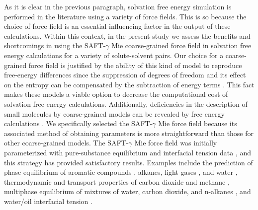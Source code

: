 \documentclass[final,12p,times,twocolumn]{elsarticle}
\begin{document}
	As it is clear in the previous paragraph, solvation free energy simulation is performed in the literature using a variety of force fields. This is so because the choice of force field is an essential influencing factor in the output of these calculations. Within this context, in the present study we assess the benefits and shortcomings in using the SAFT-$\gamma$ Mie coarse-grained force field \cite{avendano2011} in solvation free energy calculations for a variety of solute-solvent pairs. Our choice for a coarse-grained force field is justified by the ability of this kind of model to reproduce free-energy differences since the suppression of degrees of freedom and its effect on the entropy can be compensated by the subtraction of energy terms \cite{kmiecik2016}. This fact makes these models a viable option to decrease the computational cost of solvation-free energy calculations. Additionally, deficiencies in the description of small molecules by coarse-grained models can be revealed by free energy calculations \cite{mobley2007,shirts2013}. We specifically selected the SAFT-$\gamma$ Mie force field because its associated method of obtaining parameters is more straightforward than those for other coarse-grained models. The SAFT-$\gamma$ Mie force field was initially parameterized with pure-substance equilibrium and interfacial tension data \cite{avendano2011}, and this strategy has provided satisfactory results. Examples include the prediction of phase equilibrium of aromatic compounds \cite{muller2017}, alkanes, light gases \cite{herdes2015}, and water \cite{lobanova2015}, thermodynamic and transport properties of carbon dioxide and methane \cite{cassiano1, cassiano2, cassiano3}, multiphase equilibrium of mixtures of water, carbon dioxide, and n-alkanes \cite{lobanova2016}, and water/oil interfacial tension \cite{herdes2017}.
	
\end{document}
